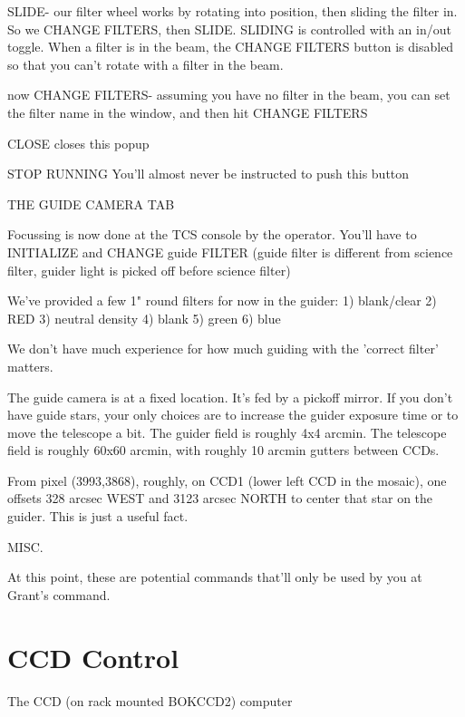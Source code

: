 \documentclass[letterpaper,12pt]{article}
\begin{document}
        SLIDE- our filter wheel works by rotating into position, then
         sliding the filter in. So we CHANGE FILTERS, then SLIDE.
         SLIDING is controlled with an in/out toggle. When a filter
         is in the beam, the CHANGE FILTERS button is disabled so
         that you can't rotate with a filter in the beam.

        now CHANGE FILTERS- assuming you have no filter in the beam,
         you can set the filter name in the window, and then hit
         CHANGE FILTERS

        CLOSE closes this popup

        STOP RUNNING 
        You'll almost never be instructed to push this button



    THE GUIDE CAMERA TAB

      Focussing is now done at the TCS console by the operator.
      You'll have to INITIALIZE and CHANGE guide FILTER (guide filter
       is different from science filter, guider light is picked
       off before science filter)

      We've provided a few 1" round filters for now in the guider:
        1) blank/clear
        2) RED
        3) neutral density
        4) blank
        5) green
        6) blue

      We don't have much experience for how much guiding with the
      'correct filter' matters.


     The guide camera is at a fixed location. It's fed by a pickoff
     mirror. If you don't have guide stars, your only choices are
     to increase the guider exposure time or to move the telescope a bit.
     The guider field is roughly 4x4 arcmin. The telescope field is roughly
     60x60 arcmin, with roughly 10 arcmin gutters between CCDs.

     From pixel (3993,3868), roughly, on CCD1 (lower left CCD in
     the mosaic), one offsets 328 arcsec WEST and 3123 arcsec NORTH
     to center that star on the guider. This is just a useful
     fact.


     MISC.

     At this point, these are potential commands that'll only
     be used by you at Grant's command.

\section{CCD Control}

     The CCD (on rack mounted BOKCCD2) computer
\end{document}
